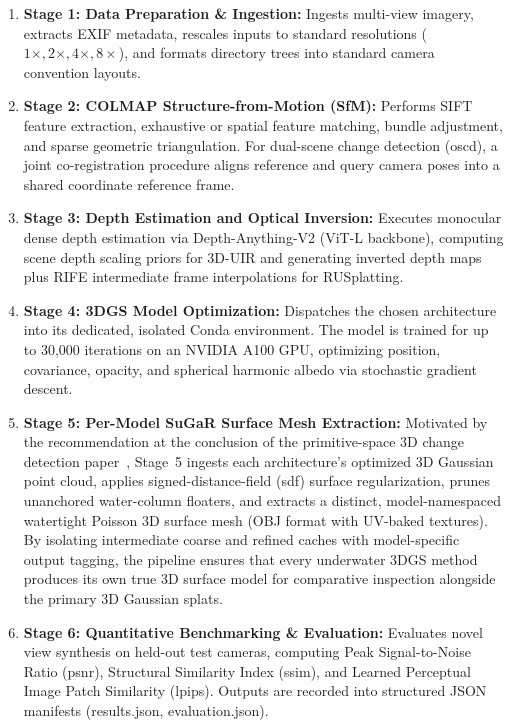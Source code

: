 \begin{enumerate}
    \item \textbf{Stage 1: Data Preparation \& Ingestion:} Ingests multi-view imagery, extracts EXIF metadata, rescales inputs to standard resolutions ($1\times, 2\times, 4\times, 8\times$), and formats directory trees into standard camera convention layouts.
    \item \textbf{Stage 2: COLMAP Structure-from-Motion (SfM):} Performs SIFT feature extraction, exhaustive or spatial feature matching, bundle adjustment, and sparse geometric triangulation. For dual-scene change detection (\gls{oscd}), a joint co-registration procedure aligns reference and query camera poses into a shared coordinate reference frame.
    \item \textbf{Stage 3: Depth Estimation and Optical Inversion:} Executes monocular dense depth estimation via Depth-Anything-V2 (ViT-L backbone), computing scene depth scaling priors for 3D-UIR and generating inverted depth maps plus RIFE intermediate frame interpolations for RUSplatting.
    \item \textbf{Stage 4: 3DGS Model Optimization:} Dispatches the chosen architecture into its dedicated, isolated Conda environment. The model is trained for up to 30,000 iterations on an NVIDIA A100 GPU, optimizing position, covariance, opacity, and spherical harmonic albedo via stochastic gradient descent.
    \item \textbf{Stage 5: Per-Model SuGaR Surface Mesh Extraction:} Motivated by the recommendation at the conclusion of the primitive-space 3D change detection paper~\cite{galappaththige2026pixelsprimitivesscenechange}, Stage~5 ingests each architecture's optimized 3D Gaussian point cloud, applies signed-distance-field (\gls{sdf}) surface regularization, prunes unanchored water-column floaters, and extracts a distinct, model-namespaced watertight Poisson 3D surface mesh (OBJ format with UV-baked textures). By isolating intermediate coarse and refined caches with model-specific output tagging, the pipeline ensures that every underwater 3DGS method produces its own true 3D surface model for comparative inspection alongside the primary 3D Gaussian splats.
    \item \textbf{Stage 6: Quantitative Benchmarking \& Evaluation:} Evaluates novel view synthesis on held-out test cameras, computing Peak Signal-to-Noise Ratio (\gls{psnr}), Structural Similarity Index (\gls{ssim}), and Learned Perceptual Image Patch Similarity (\gls{lpips}). Outputs are recorded into structured JSON manifests (results.json, evaluation.json).
\end{enumerate}

